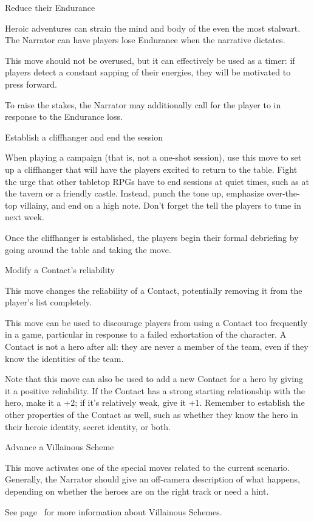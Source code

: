 \begin{narratormove}{Reduce their Endurance}
{
  \label{move:reduce-endurance}
  Heroic adventures can strain the mind and body of the
  even the most stalwart.
  The Narrator can have players lose Endurance when the
  narrative dictates.

  This move should not be overused, but it can effectively be
  used as a timer: if players detect a constant sapping of their
  energies, they will be motivated to press forward.

  To raise the stakes, the Narrator may additionally
  call for the player to  in response to
  the Endurance loss.
}
\end{narratormove}

\begin{narratormove}{Establish a cliffhanger and end the session}
{
  When playing a campaign (that is, not a one-shot session),
  use this move to set up a cliffhanger that will have
  the players excited to return to the table.
  Fight the urge that other tabletop RPGs have to end sessions
  at quiet times, such as at the tavern or a friendly castle.
  Instead, punch the tone up, emphasize over-the-top
  villainy, and end on a high note.
  Don't forget the tell the players to tune in next week.

  Once the cliffhanger is established, the players begin their
  formal debriefing by going around the table and taking the
   move.
}
\end{narratormove}

\begin{narratormove}{Modify a Contact's reliability}
{
  \label{move:change-reliability}
  This move changes the reliability of a Contact, potentially
  removing it from the player's list completely.

  This move can be used to discourage players from using a Contact
  too frequently in a game, particular in response to a failed
  exhortation of the character. A Contact is not a hero after all: they
  are never a member of the team, even if they know the identities
  of the team.  

  Note that this move can also be used to add a new Contact for a hero
  by giving it a positive reliability.  If the Contact has a strong
  starting relationship with the hero, make it a +2; if it's
  relatively weak, give it +1.  Remember to establish the other
  properties of the Contact as well, such as whether they know the
  hero in their heroic identity, secret identity, or both.
}
\end{narratormove}

\begin{narratormove}{Advance a Villainous Scheme}
{
  This move activates one of the special moves related to the
  current scenario.
  Generally, the Narrator should give an off-camera description
  of what happens, depending on whether the heroes are on the
  right track or need a hint.
  
  See page~\pageref{sec:schemes} for more
  information about Villainous Schemes.
}
\end{narratormove}


